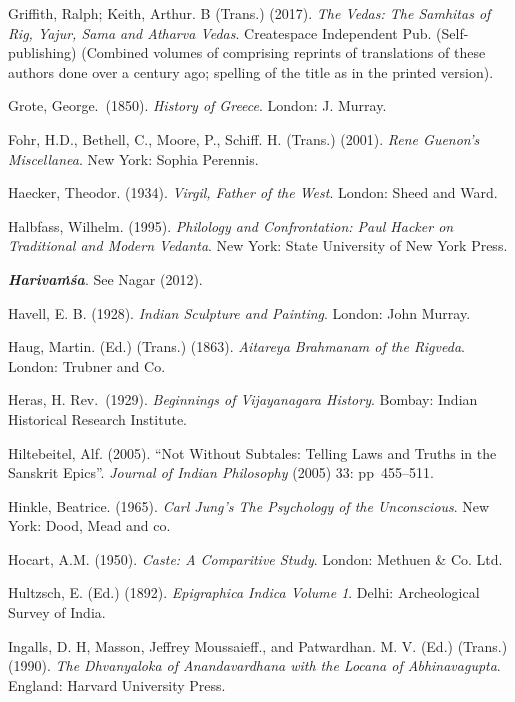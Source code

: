 \begin{thebibliography}{99}
Griffith, Ralph; Keith, Arthur. B (Trans.) (2017). {\sl The Vedas: The Samhitas of Rig, Yajur, Sama and Atharva Vedas}. Createspace Independent Pub. (Self-publishing) (Combined volumes of comprising reprints of translations of these authors done over a century ago; spelling of the title as in the printed version).

Grote, George.\ (1850). {\sl History of Greece}.  London: J. Murray. 

Fohr, H.D., Bethell, C., Moore, P., Schiff. H. (Trans.) (2001). {\sl Rene Guenon’s Miscellanea}. New York: Sophia Perennis. 

Haecker, Theodor. (1934). {\sl Virgil, Father of the West}. London: Sheed and Ward. 

Halbfass, Wilhelm. (1995). {\sl Philology and Confrontation: Paul Hacker on Traditional and Modern Vedanta}. New York: State University of New York Press. 

{\sl\bfseries Harivaṁśa}. See Nagar (2012). 

Havell, E. B. (1928). {\sl Indian Sculpture and Painting}. London: John Murray. 

Haug, Martin. (Ed.) (Trans.) (1863). {\sl Aitareya Brahmanam of the Rigveda}. London: Trubner and Co. 

Heras, H. Rev.\ (1929). {\sl Beginnings of Vijayanagara History}. Bombay: Indian Historical Research Institute. 

Hiltebeitel, Alf. (2005). “Not Without Subtales: Telling Laws and Truths in the Sanskrit Epics”. {\sl Journal 
of Indian Philosophy} (2005) 33: pp~455--511.

Hinkle, Beatrice. (1965). {\sl Carl Jung’s The Psychology of the Unconscious}. New York: Dood, Mead and co. 

Hocart, A.M. (1950). {\sl Caste: A Comparitive Study}. London: Methuen \& Co. Ltd. 

Hultzsch, E. (Ed.) (1892). {\sl Epigraphica Indica Volume 1}. Delhi: Archeological Survey of India. 

Ingalls, D. H,  Masson, Jeffrey Moussaieff., and Patwardhan. M. V. (Ed.) (Trans.) (1990). {\sl The Dhvanyaloka of 
Anandavardhana with the Locana of Abhinavagupta}. England: Harvard University Press. 


\end{thebibliography}
